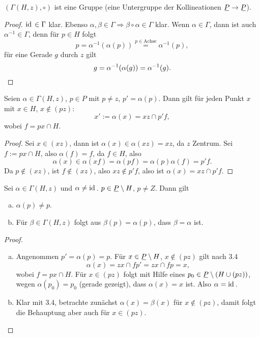 \begin{lem}
 $(\Gamma(H,z), \circ)$ ist eine Gruppe (eine Untergruppe der Kollineationen $\proj \to \proj$).
\end{lem}

\begin{proof}
 $\mathrm{id}\, \in \Gamma$ klar. Ebenso $\alpha, \beta \in \Gamma \Rightarrow \beta \circ \alpha \in \Gamma$ klar. Wenn $\alpha \in \Gamma$, dann ist auch $\alpha^{-1} \in \Gamma$, denn für $p \in H$ folgt 
 \[ p = \alpha^{-1} ( \alpha(p) ) \overset{p \in \text{Achse}}{=} \alpha^{-1}(p), \]
 für eine Gerade $g$ durch $z$ gilt
 \[ g = \alpha^{-1}( \alpha (g) ) = \alpha^{-1} (g). \qedhere \]
\end{proof}

\begin{lem}
 Seien $\alpha \in \Gamma(H,z)$, $p \in P$ mit $p \ne z$, $p' = \alpha(p)$. Dann gilt für jeden Punkt $x$ mit $x \in H$, $x \notin (pz)$:
 \[ x' := \alpha(x) = xz \cap p'f, \]
 wobei $f = px \cap H$.
\end{lem}

\begin{proof}
 Sei $x \in (xz)$, dann ist $\alpha(x) \in \alpha(xz) = xz$, da $z$ Zentrum. Sei $f := px \cap H$, also $\alpha(f) = f$, da $f \in H$, also 
 \[ \alpha(x) \in \alpha( xf ) = \alpha( pf ) = \alpha(p) \alpha(f) = p'f. \]
 Da $p \notin (xz)$, ist $f \notin (xz)$, also $xz \notin p'f$, also ist $\alpha(x) = xz \cap p'f$.
\end{proof}

\begin{folg}
 Sei $\alpha \in \Gamma(H,z)$ und $\alpha \ne \mathrm{id}\,$. $p \in \proj \setminus H$, $p \ne Z$. Dann gilt
 \begin{enumerate}[a)]
  \item $\alpha(p) \ne p$.
  \item Für $\beta \in \Gamma(H,z)$ folgt aus $\beta(p) = \alpha(p)$, dass $\beta = \alpha$ ist.
 \end{enumerate}
\end{folg}

\begin{proof}
 \begin{enumerate}[a)]
  \item Angenommen $p' = \alpha(p) = p$. Für $x \in \proj \setminus H$, $x \notin (pz)$ gilt nach 3.4
  \[ \alpha(x) = zx \cap fp' = zx \cap fp = x, \]
  wobei $f = px \cap H$. Für $x \in (pz)$ folgt mit Hilfe eines $p_0 \in \proj \setminus (H \cup (pz))$, wegen $\alpha( p_0 ) = p_0$ (gerade gezeigt), dass $\alpha(x) = x$ ist. Also $\alpha = \mathrm{id}\,$.
  \item Klar mit 3.4, betrachte zunächst $\alpha(x) = \beta(x)$ für $x \notin (pz)$, damit folgt die Behauptung aber auch für $x \in (pz)$. \qedhere
 \end{enumerate}
\end{proof}

